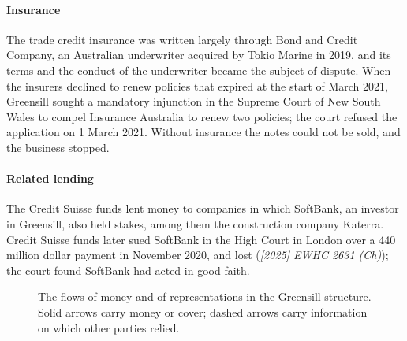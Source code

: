 \paragraph{Insurance} The trade credit insurance was written largely through Bond and Credit Company, an Australian underwriter acquired by Tokio Marine in 2019, and its terms and the conduct of the underwriter became the subject of dispute. When the insurers declined to renew policies that expired at the start of March 2021, Greensill sought a mandatory injunction in the Supreme Court of New South Wales to compel Insurance Australia to renew two policies; the court refused the application on 1 March 2021. Without insurance the notes could not be sold, and the business stopped.

\paragraph{Related lending} The Credit Suisse funds lent money to companies in which SoftBank, an investor in Greensill, also held stakes, among them the construction company Katerra. Credit Suisse funds later sued SoftBank in the High Court in London over a 440 million dollar payment in November 2020, and lost (\emph{[2025] EWHC 2631 (Ch)}); the court found SoftBank had acted in good faith.

\begin{figure}[t]
\centering
{}
\caption{The flows of money and of representations in the Greensill structure. Solid arrows carry money or cover; dashed arrows carry information on which other parties relied.}
\label{fig:greensillflows}
\end{figure}


